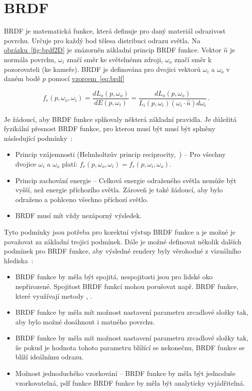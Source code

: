\documentclass[czech,master]{diploma}
\newcommand{\uvec}[1]{\hat{#1}}
\newcommand{\point}{p}
\newcommand{\brdf}{f_r\left(\point,\omega_{o},\omega_{i}\right)}
\newcommand{\normVec}{\uvec{n}}
\newcommand{\inVec}{\omega_{i}}
\newcommand{\outVec}{\omega_{o}}
\newcommand{\outRadiance}{L_o\left(\point,\outVec\right)}
\newcommand{\inRadiance}{L_i\left(\point,\inVec\right)}
\newcommand{\difirradiance}{dE\left(\point,\inVec\right)}
\newcommand{\inDotNorm}{\left(\inVec\cdot\normVec\right)}
\begin{document}
\clearpage
\chapter{BRDF}
BRDF je matematická funkce, která definuje pro daný materiál odrazivost povrchu. Určuje pro každý bod tělesa distribuci odrazu světla. Na \hyperref[fig:brdf2D]{obrázku~\ref{fig:brdf2D}} je znázorněn základní princip BRDF funkce. Vektor \(\normVec\) je normála povrchu, \(\inVec\) značí směr ke světelnému zdroji, \(\outVec\) značí směr k pozorovateli (ke kameře). BRDF je definována pro dvojici vektorů  \(\inVec\) a \(\outVec\) v daném bodě \(p\) pomocí \hyperref[eq:brdf]{vzorcem~\ref{eq:brdf}}

\begin{equation} \label{eq:brdf}
  \brdf = \frac{d\outRadiance}{\difirradiance} = \frac{d\outRadiance}{\inRadiance \inDotNorm d\inVec}\,.
\end{equation}

Je žádoucí, aby BRDF funkce splňovaly některá základní pravidla. Je důležitá  fyzikální přesnost BRDF funkce, pro kterou musí být musí být splněny následující podmínky~\cite{PHARR2017313}:

\begin{itemize}
  \item Princip vzájemnosti (Helmholtzův princip reciprocity,~\cite{hapke_2012}) -- Pro všechny dvojice \(\inVec\) a \(\outVec\) platí: \(\brdf = f_r\left(p,\inVec,\outVec\right)\).
  \item Princip zachování energie -- Celková energie odraženého světla nemůže být vyšší, než energie příchozího světla. Zároveň je také žádoucí, aby bylo odraženo a pohlceno všechno příchozí světlo.
  \item BRDF musí mít vždy nezáporný výsledek.
\end{itemize}
Tyto podmínky jsou potřeba pro korektní výstup BRDF funkce a je možné je považovat za základní trojici podmínek. Dále je možné definovat několik dalších podmínek pro BRDF funkce, aby výsledné rendery byly věrohodné z vizuálního hlediska~\cite{EnergyConservingRadziszewski}:

\begin{itemize}
  \item BRDF funkce by měla být spojitá, nespojitosti jsou pro lidské oko nepřirozené. Spojitost BRDF funkcí mohou porušovat např. BRDF funkce, které využívají metody , .
  \item BRDF funkce by měla mít možnost nastavení parametru zrcadlové složky tak, aby bylo možné dosáhnout i matného povrchu.
  \item BRDF funkce by měla mít možnost nastavení parametru zrcadlové složky tak, že pokud je hodnota tohoto parametru blížící se nekonečnu, BRDF funkce se blíží ideálnímu odrazu.
  \item Možnost jednoduchého vzorkování -- BRDF funkce by měla být jednoduše vzorkovatelná, pdf funkce BRDF funkce by měla být analyticky vyjádřitelná.
\end{itemize}
\end{document}
